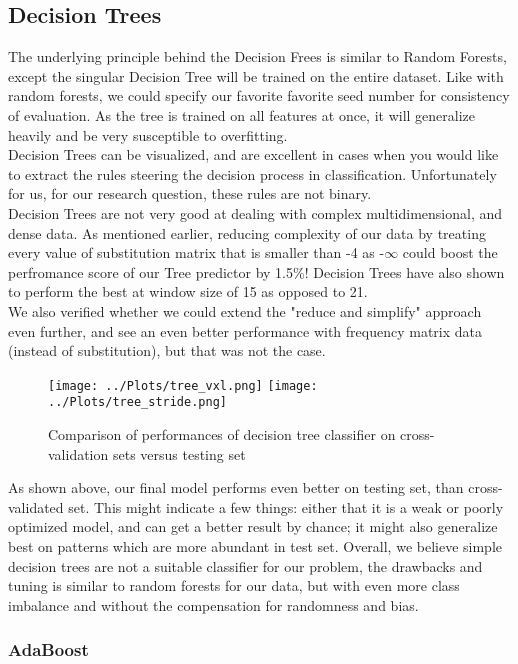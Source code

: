 \documentclass[12pt]{article}
\begin{document}
\subsection{Decision Trees}
The underlying principle behind the Decision Frees is similar to Random Forests, except the singular Decision Tree will be trained on the entire dataset. Like with random forests, we could specify our favorite favorite seed number for consistency of evaluation. As the tree is trained on all features at once, it will generalize heavily and be very susceptible to overfitting.\\
Decision Trees can be visualized, and are excellent in cases when you would like to extract the rules steering the decision process in classification. Unfortunately for us, for our research question, these rules are not binary.\\ Decision Trees are not very good at dealing with complex multidimensional, and dense data. As mentioned earlier, reducing complexity of our data by treating every value of substitution matrix that is smaller than -4 as -$\infty$ could boost the perfromance score of our Tree predictor by 1.5\%! Decision Trees have also shown to perform the best at window size of 15 as opposed to 21.\\
\newpage
\noindent We also verified whether we could extend the "reduce and simplify" approach even further, and see an even better performance with frequency matrix data (instead of substitution), but that was not the case.
\begin{figure}[H]
\hspace*{-0.6in}
\texttt{[image: ../Plots/tree\_vxl.png]} 
\hspace*{-0.6in}
\texttt{[image: ../Plots/tree\_stride.png]}
\caption{Comparison of performances of decision tree classifier on cross-validation sets versus testing set}
\end{figure}

\noindent As shown above, our final model performs even better on testing set, than cross-validated set. This might indicate a few things: either that it is a weak or poorly optimized model, and can get a better result by chance; it might also generalize best on patterns which are more abundant in test set. Overall, we believe simple decision trees are not a suitable classifier for our problem, the drawbacks and tuning is similar to random forests for our data, but with even more class imbalance and without the compensation for randomness and bias.
\subsubsection{AdaBoost}
\end{document}
